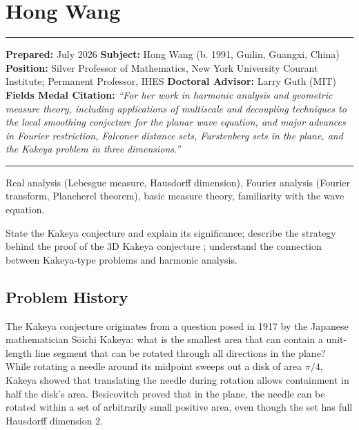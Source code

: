 \chapter{Hong Wang}\label{ch2026hongwang:hong-wang-fields-medal-2026}

\begin{center}\rule{0.5\linewidth}{0.5pt}\end{center}

\textbf{Prepared:} July 2026 \textbf{Subject:} Hong Wang (b. 1991, Guilin, Guangxi, China) \textbf{Position:} Silver Professor of Mathematics, New York University Courant Institute; Permanent Professor, IHES \textbf{Doctoral Advisor:} Larry Guth (MIT) \textbf{Fields Medal Citation:} \emph{``For her work in harmonic analysis and geometric measure theory, including applications of multiscale and decoupling techniques to the local smoothing conjecture for the planar wave equation, and major advances in Fourier restriction, Falconer distance sets, Furstenberg sets in the plane, and the Kakeya problem in three dimensions.''}

\begin{center}\rule{0.5\linewidth}{0.5pt}\end{center}

\begin{prereqs} Real analysis (Lebesgue measure, Hausdorff dimension), Fourier analysis (Fourier transform, Plancherel theorem), basic measure theory, familiarity with the wave equation. \end{prereqs}

\begin{objectives} State the Kakeya conjecture and explain its significance; describe the strategy behind the proof of the 3D Kakeya conjecture \cite{wangzahl2025}; understand the connection between Kakeya-type problems and harmonic analysis. \end{objectives}

\section{Problem History}

The Kakeya conjecture originates from a question posed in 1917 by the Japanese mathematician S\={o}ichi Kakeya: what is the smallest area that can contain a unit-length line segment that can be rotated through all directions in the plane? While rotating a needle around its midpoint sweeps out a disk of area $\pi/4$, Kakeya showed that translating the needle during rotation allows containment in half the disk's area. Besicovitch proved that in the plane, the needle can be rotated within a set of arbitrarily small positive area, even though the set has full Hausdorff dimension 2.

